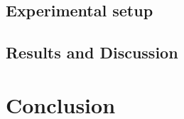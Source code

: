 \documentclass{article}
\begin{document}
\subsection{Experimental setup}
\label{subsec:setup}

\subsection{Results and Discussion}
\label{subsec:results}

\section{Conclusion}
\label{sec:conclusion}




\end{document}
